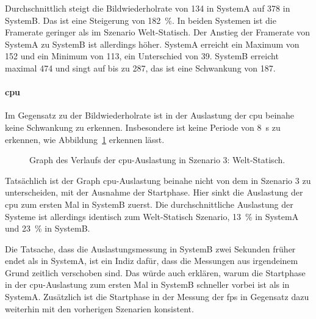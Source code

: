Durchschnittlich steigt die Bildwiederholrate von \SI{134}{\fps} in SystemA auf \SI{378}{\fps} in SystemB. Das ist eine Steigerung von \SI{182}{\percent}. In beiden Systemen ist die Framerate geringer als im Szenario Welt-Statisch. Der Anstieg der Framerate von SystemA zu SystemB ist allerdings höher. SystemA erreicht ein Maximum von \SI{152}{\fps} und ein Minimum von \SI{113}{\fps}, ein Unterschied von \SI{39}{\fps}. SystemB erreicht maximal \SI{474}{\fps} und singt auf bis zu \SI{287}{\fps}, das ist eine Schwankung von \SI{187}{\fps}.

\paragraph{\ac{cpu}}
Im Gegensatz zu der Bildwiederholrate ist in der Auslastung der \ac{cpu} beinahe keine Schwankung zu erkennen. Insbesondere ist keine Periode von \SI{8}{\second} zu erkennen, wie Abbildung~\ref{fig:seed-0-rotate-cpu} erkennen lässt.
\begin{figure}[!htbp]
	\caption[Graph des Verlaufs der -Auslastung in Szenario 4: Welt-Rotation.]{Graph des Verlaufs der \ac{cpu}-Auslastung in Szenario 3: Welt-Statisch.}\label{fig:seed-0-rotate-cpu}
\end{figure}
Tatsächlich ist der Graph \ac{cpu}-Auslastung beinahe nicht von dem in Szenario 3 zu unterscheiden, mit der Ausnahme der Startphase. Hier sinkt die Auslastung der \ac{cpu} zum ersten Mal in SystemB zuerst. Die durchschnittliche Auslastung der Systeme ist allerdings identisch zum Welt-Statisch Szenario, \SI{13}{\percent} in SystemA und \SI{23}{\percent} in SystemB.

Die Tatsache, dass die Auslastungsmessung in SystemB zwei Sekunden früher endet als in SystemA, ist ein Indiz dafür, dass die Messungen aus irgendeinem Grund zeitlich verschoben sind. Das würde auch erklären, warum die Startphase in der \ac{cpu}-Auslastung zum ersten Mal in SystemB schneller vorbei ist als in SystemA. Zusätzlich ist die Startphase in der Messung der \ac{fps} in Gegensatz dazu weiterhin mit den vorherigen Szenarien konsistent. 

